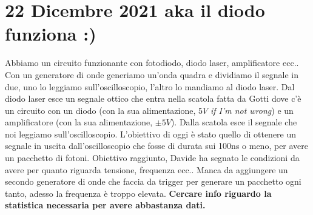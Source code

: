 \documentclass{article}
\numberwithin{equation}{section}
\begin{document}
\section{22 Dicembre 2021 aka il diodo funziona :)}
Abbiamo un circuito funzionante con fotodiodo, diodo laser, amplificatore ecc..
Con un generatore di onde generiamo un'onda quadra e dividiamo il segnale in due, uno lo leggiamo sull'oscilloscopio, l'altro lo mandiamo al diodo laser. Dal diodo laser esce un segnale ottico che entra nella scatola fatta da Gotti dove c'è un circuito con un diodo (con la sua alimentazione, $5V$ \textit{if I'm not wrong}) e un amplificatore (con la sua alimentazione, $\pm 5V$). Dalla scatola esce il segnale che noi leggiamo sull'oscilloscopio.
L'obiettivo di oggi è stato quello di ottenere un segnale in uscita dall'oscilloscopio che fosse di durata sui 100ns o meno, per avere un pacchetto di fotoni.
Obiettivo raggiunto, Davide ha segnato le condizioni da avere per quanto riguarda tensione, frequenza ecc..
Manca da aggiungere un secondo generatore di onde che faccia da trigger per generare un pacchetto ogni tanto, adesso la frequenza è troppo elevata.
\textbf{Cercare info riguardo la statistica necessaria per avere abbastanza dati.}
\end{document}
